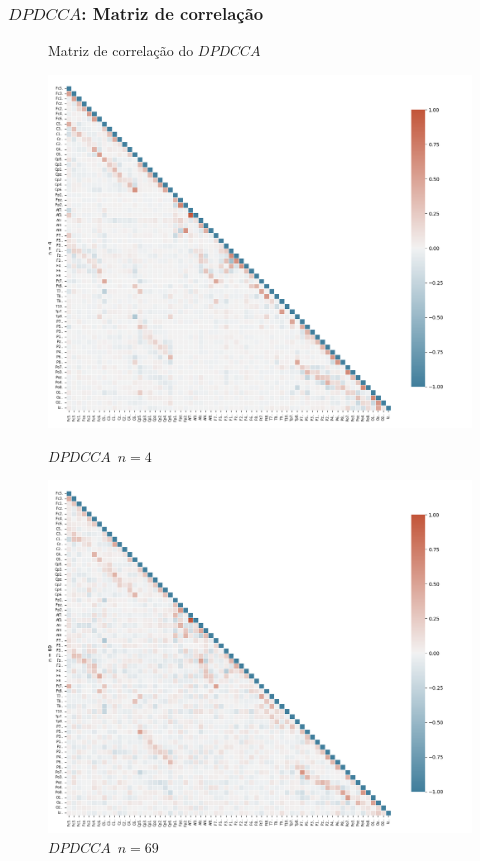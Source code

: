 \documentclass[11pt, aspectratio=169]{beamer}
\begin{document}
\begin{frame}
\frametitle{$DPDCCA$: Matriz de correlação}
\begin{figure}[ht]
  \caption{Matriz de correlação do $DPDCCA$}
  \begin{minipage}[b]{0.45\textwidth}
    \includegraphics[width=\textwidth]{../Figures/test_dmc/dpdcca4.png}
    \caption{$DPDCCA$~$n = 4$}
  \end{minipage}
  \hfill
  \begin{minipage}[b]{0.45\textwidth}
    \includegraphics[width=\textwidth]{../Figures/test_dmc/dpdcca69.png}
    \caption{$DPDCCA$~$n = 69$}
  \end{minipage}
\end{figure}
\end{frame}
\end{document}
